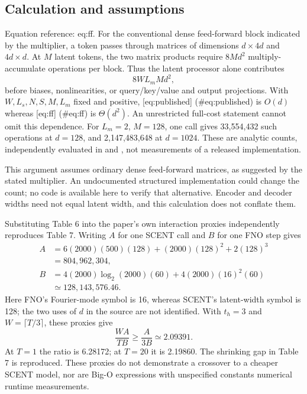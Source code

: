 \documentclass[10pt]{article}
\begin{document}
\subsection*{Calculation and assumptions}
Equation reference: eq:ff. For the conventional dense feed-forward block indicated by the multiplier, a token passes through matrices of dimensions \(d\times4d\) and \(4d\times d\). At \(M\) latent tokens, the two matrix products require \(8Md^2\) multiply-accumulate operations per block. Thus the latent processor alone contributes \[
8WL_mMd^2,\] before biases, nonlinearities, or query/key/value and output projections. With \(W,L_s,N,S,M,L_m\) fixed and positive, [eq:published] (\#eq:published) is \(O(d)\) whereas [eq:ff] (\#eq:ff) is \(\Theta(d^2)\). An unrestricted full-cost statement cannot omit this dependence. For \(L_m=2\), \(M=128\), one call gives 33,554,432 such operations at \(d=128\), and 2,147,483,648 at \(d=1024\). These are analytic counts, independently evaluated in and , not measurements of a released implementation.\par
This argument assumes ordinary dense feed-forward matrices, as suggested by the stated multiplier. An undocumented structured implementation could change the count; no code is available here to verify that alternative. Encoder and decoder widths need not equal latent width, and this calculation does not conflate them.\par
Substituting Table 6 into the paper’s own interaction proxies independently reproduces Table 7. Writing \(A\) for one SCENT call and \(B\) for one FNO step gives \[\begin{aligned}
A&=6(2000)(500)(128)+(2000)(128)^2+2(128)^3\\
 &=804{,}962{,}304,\nonumber\\
B&=4(2000)\log_2(2000)(60)+4(2000)(16)^2(60)\\
 &\simeq128{,}143{,}576.46.\nonumber\end{aligned}\] Here FNO’s Fourier-mode symbol is 16, whereas SCENT’s latent-width symbol is 128; the two uses of \(d\) in the source are not identified. With \(t_h=3\) and \(W=\lceil T/3\rceil\), these proxies give \[\frac{WA}{TB}\geq\frac{A}{3B}\simeq2.09391.\] At \(T=1\) the ratio is 6.28172; at \(T=20\) it is 2.19860. The shrinking gap in Table 7 is reproduced. These proxies do not demonstrate a crossover to a cheaper SCENT model, nor are Big-O expressions with unspecified constants numerical runtime measurements.\par
\end{document}

